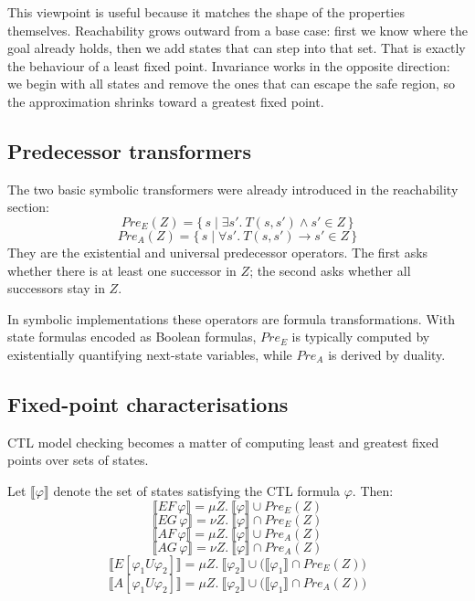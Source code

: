 This viewpoint is useful because it matches the shape of the properties
themselves.  Reachability grows outward from a base case: first we know where
the goal already holds, then we add states that can step into that set.  That
is exactly the behaviour of a least fixed point.  Invariance works in the
opposite direction: we begin with all states and remove the ones that can
escape the safe region, so the approximation shrinks toward a greatest fixed
point.

\subsection{Predecessor transformers}

The two basic symbolic transformers were already introduced in the reachability
section:
\[
  Pre_E(Z) = \{\, s \mid \exists s'.\ T(s,s') \land s' \in Z \,\}
\]
\[
  Pre_A(Z) = \{\, s \mid \forall s'.\ T(s,s') \rightarrow s' \in Z \,\}
\]
They are the existential and universal predecessor operators.  The first asks
whether there is at least one successor in $Z$; the second asks whether all
successors stay in $Z$.

\begin{note}
In symbolic implementations these operators are formula transformations.  With
state formulas encoded as Boolean formulas, $Pre_E$ is typically computed by
existentially quantifying next-state variables, while $Pre_A$ is derived by
duality.
\end{note}

\subsection{Fixed-point characterisations}

CTL model checking becomes a matter of computing least and greatest fixed
points over sets of states.

\begin{proposition}
Let $\llbracket \varphi \rrbracket$ denote the set of states satisfying the
CTL formula $\varphi$.  Then:
\[
  \llbracket EF\,\varphi \rrbracket = \mu Z.\ \llbracket \varphi \rrbracket \cup Pre_E(Z)
\]
\[
  \llbracket EG\,\varphi \rrbracket = \nu Z.\ \llbracket \varphi \rrbracket \cap Pre_E(Z)
\]
\[
  \llbracket AF\,\varphi \rrbracket = \mu Z.\ \llbracket \varphi \rrbracket \cup Pre_A(Z)
\]
\[
  \llbracket AG\,\varphi \rrbracket = \nu Z.\ \llbracket \varphi \rrbracket \cap Pre_A(Z)
\]
\[
  \llbracket E[\varphi_1 U \varphi_2] \rrbracket
  = \mu Z.\ \llbracket \varphi_2 \rrbracket \cup
    \bigl(\llbracket \varphi_1 \rrbracket \cap Pre_E(Z)\bigr)
\]
\[
  \llbracket A[\varphi_1 U \varphi_2] \rrbracket
  = \mu Z.\ \llbracket \varphi_2 \rrbracket \cup
    \bigl(\llbracket \varphi_1 \rrbracket \cap Pre_A(Z)\bigr)
\]
\end{proposition}

